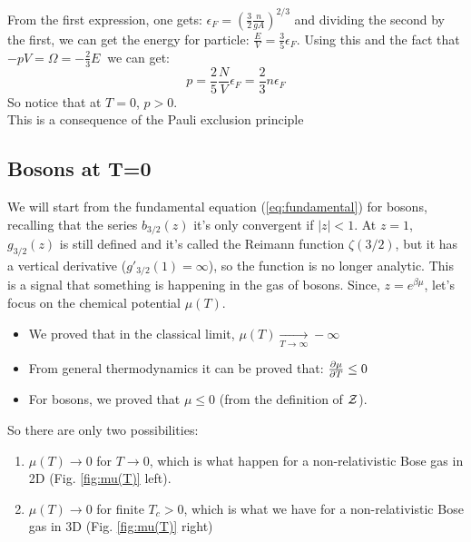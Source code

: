 From the first expression, one gets: $\epsilon_F = \left(\frac32 \frac n {gA}\right)^{2/3}$ and dividing the second by the first, we can get the energy for particle: $\frac EV = \frac35 \epsilon_F$.
Using this and the fact that $-pV = \Omega = -\frac23 E\ $ we can get: $$p= \frac25\frac NV \epsilon_F = \frac23 n \epsilon_F$$ 
So notice that at $T=0$, \quad $p > 0$.\\ This is a consequence of the Pauli exclusion principle\\

\subsection{Bosons at T=0}
We will start from the fundamental equation (\ref{eq:fundamental}) for bosons, recalling that the series $b_{3/2}(z)$ it's only convergent if $|z| < 1$. At $z=1$,  $g_{3/2}(z)$ is still defined and it's called the Reimann function $\zeta(3/2)$, but it has a vertical derivative ($g'_{3/2}(1) = \infty$), so the function is no longer analytic. This is a signal that something is happening in the gas of bosons. Since, $z = e^{\beta\mu}$, let's focus on the chemical potential $\mu(T)$.

\begin{itemize}
    \item We proved that in the classical limit, $\mu(T) \xrightarrow[T\to\infty]{}-\infty$
    \item From general thermodynamics it can be proved that: $\frac{\partial\mu}{\partial T} \le 0$ \item For bosons, we proved that $\mu \le 0$ (from the definition of $\mathcal{Z}$). 
\end{itemize}
So there are only two possibilities:
\begin{enumerate}
    \item $\mu(T)\to 0$ for $T\to 0$, which is what happen for a non-relativistic Bose gas in 2D (Fig. \ref{fig:mu(T)} left).
    \item $\mu(T) \to 0$ for finite $T_c > 0$, which is what we have for a non-relativistic Bose gas in 3D (Fig. \ref{fig:mu(T)} right)
\end{enumerate}

